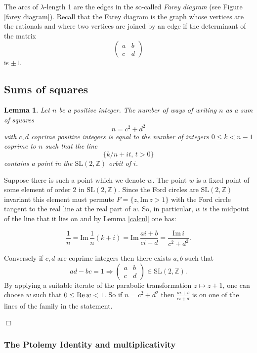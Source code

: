 \documentclass[14pt,a4paper]{amsart}
\newtheorem{lem}[thm]{Lemma}
\def\im{\mathrm{Im}\,}
\def\ZZ{\mathbb{Z}}
\def\sl2{\mathrm{SL}(2, \ZZ)}
\begin{document}
The arcs of $\lambda$-length 1 are the edges in the so-called 
\textit{Farey diagram} (see Figure \ref{farey diagram}).
Recall that the Farey diagram is the graph whose vertices are the
rationals and where two vertices are joined by an edge if the
determinant of the matrix 
$$\begin{pmatrix}
	a & b \\ c & d
\end{pmatrix}$$
is $\pm 1$.

\subsection{Sums of squares}

\begin{lem} \label{squares}
Let $n$ be a positive integer.
The number of  ways of writing $n$  as a  sum of squares
$$n = c^2 + d^2$$
with $c,d$ coprime positive  integers
is equal to the number of  integers $0 \leq k < n-1$ coprime to $n$
such that the line
$$\{  k/n + i t,\, t >0 \}$$
contains  a point in the $\sl2$  orbit of $i$.
\end{lem}


\proof  Suppose there is such  a point which we denote  $w$.
The point $w$ is a fixed point of some  element of order 2 in $\sl2$.
Since the Ford circles are $\sl2$ invariant
this element must permute $F= \{ z, \im z > 1\}$ 
with the Ford circle tangent 
to the real line  at the real part of $w$.
So, in particular, $w$ is the midpoint of the line 
that it lies on 
and by  Lemma \ref{calcul} one has:

$$\frac{1}{n} = \im \frac{1 }{n}(k + i)  
= \im  \frac{ai +b}{ci+d }
= \frac{\im i} {c^2 + d^2}.$$

Conversely if $c,d$ are coprime integers 
 then there exists $a,b$ such that
 $$ad - bc = 1 \Rightarrow  
 \begin{pmatrix}
 a & b \\
 c & d
 \end{pmatrix} \in \sl2.
$$
By applying a suitable iterate of the parabolic transformation 
$z \mapsto z + 1$,
one can choose $w$ such that $0 \leq \text{Re\,} w < 1$.
So if $n = c^2 + d^2$ then $\frac{ai +b}{ci+d }$
is on one of the lines of the family in the statement.

\hfill $\Box$


\subsubsection{The Ptolemy Identity and multiplicativity}
\end{document}
